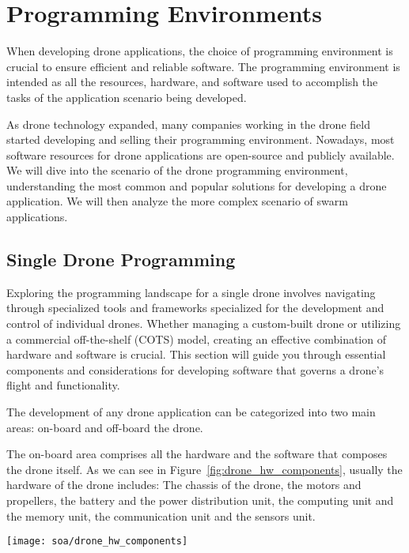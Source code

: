 \section{Programming Environments}\label{sec:soa_programming_environments}
When developing drone applications, the choice of programming environment is crucial to ensure efficient and reliable software.
The programming environment is intended as all the resources, hardware, and software used to accomplish the tasks of the 
application scenario being developed.

As drone technology expanded, many companies working in the drone field started developing and selling their programming environment. 
Nowadays, most software resources for drone applications are open-source and publicly available. 
We will dive into the scenario of the drone programming environment, understanding the most common and popular solutions 
for developing a drone application. We will then analyze the more complex scenario of swarm applications.

\subsection{Single Drone Programming}\label{subsec:programming_environments_single}
Exploring the programming landscape for a single drone involves navigating through specialized tools and 
frameworks specialized for the development and control of individual drones. 
Whether managing a custom-built drone or utilizing a commercial off-the-shelf (COTS) model, 
creating an effective combination of hardware and software is crucial. 
This section will guide you through essential components and considerations for developing software that governs a 
drone's flight and functionality.

The development of any drone application can be categorized into two main areas: on-board and off-board the drone.

The on-board area comprises all the hardware and the software that composes the drone itself. 
As we can see in Figure~\ref{fig:drone_hw_components}, usually the hardware of the drone includes: 
The chassis of the drone, the motors and propellers, the battery and the power distribution unit, the computing unit and the memory unit,
the communication unit and the sensors unit.

\begin{SCfigure}[\sidecaptionrelwidth][h]
    \texttt{[image: soa/drone\_hw\_components]}
    \caption[Drone hardware components]{The main hardware components of a drone are: 1. Drone's chassis, 2. Motors, 3. Propellers, 4. Motor mount, 5. Battery, 6. Power distribution unit, 7. Computing and memory unit, 8. Communication unit, 9. Sensors unit }
    \label{fig:drone_hw_components}
\end{SCfigure}

